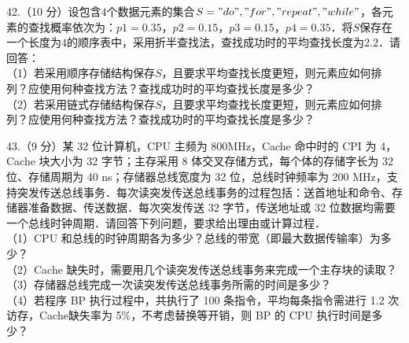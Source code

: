 42.（10 分）设包含$4$个数据元素的集合$S={"do","for"," repeat"," while"}$，各元素的查找概率依次为：$p1=0.35$，$p2 = 0.15$，$p3=0.15$，$p4=0.35$．将$S$保存在一个长度为$4$的顺序表中，采用折半查找法，查找成功时的平均查找长度为2.2．请回答： \\
（1）若采用顺序存储结构保存$S$，且要求平均查找长度更短，则元素应如何排列？应使用何种查找方法？查找成功时的平均查找长度是多少？ \\
（2）若采用链式存储结构保存$S$，且要求平均查找长度更短，则元素应如何排列？应使用何种查找方法？查找成功时的平均查找长度是多少？

43.（9 分）某 32 位计算机，CPU 主频为 800MHz，Cache 命中时的 CPI 为 4，Cache 块大小为
32 字节；主存采用 8 体交叉存储方式，每个体的存储字长为 32 位、存储周期为 40 ns；存储器总线宽度为 32 位，总线时钟频率为 200 MHz，支持突发传送总线事务．每次读突发传送总线事务的过程包括：送首地址和命令、存储器准备数据、传送数据．每次突发传送 32 字节，传送地址或 32 位数据均需要一个总线时钟周期．请回答下列问题，要求给出理由或计算过程．  \\
（1）CPU 和总线的时钟周期各为多少？总线的带宽（即最大数据传输率）为多少？  \\
（2）Cache 缺失时，需要用几个读突发传送总线事务来完成一个主存块的读取？  \\
（3）存储器总线完成一次读突发传送总线事务所需的时间是多少？  \\
（4）若程序 BP 执行过程中，共执行了 100 条指令，平均每条指令需进行 1.2 次访存，Cache缺失率为 5\%，不考虑替换等开销，则 BP 的 CPU 执行时间是多少？ 

